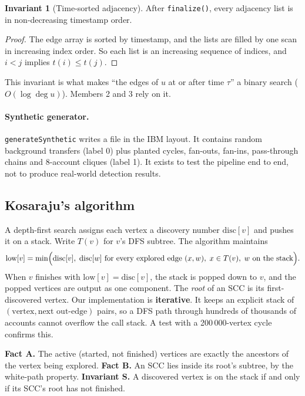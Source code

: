 \documentclass[11pt,a4paper]{article}
\theoremstyle{definition}
\newtheorem{invariant}[definition]{Invariant}
\begin{document}
\begin{invariant}[Time-sorted adjacency]
After \texttt{finalize()}, every adjacency list is in non-decreasing timestamp order.
\end{invariant}

\begin{proof}
The edge array is sorted by timestamp, and the lists are filled by one scan in increasing index order. So each list is an increasing sequence of indices, and $i < j$ implies $t(i) \le t(j)$.
\end{proof}

This invariant is what makes ``the edges of $u$ at or after time $\tau$'' a binary search ($O(\log \deg u)$). Members 2 and 3 rely on it.

\paragraph{Synthetic generator.} \texttt{generateSynthetic} writes a file in the IBM layout. It contains random background transfers (label 0) plus planted cycles, fan-outs, fan-ins, pass-through chains and 8-account cliques (label 1). It exists to test the pipeline end to end, not to produce real-world detection results.

\subsection{Kosaraju's algorithm}
A depth-first search assigns each vertex a discovery number $\text{disc}[v]$ and pushes it on a stack. Write $T(v)$ for $v$'s DFS subtree. The algorithm maintains
\[
\text{low}[v] = \min\Bigl(\text{disc}[v],\;\text{disc}[w] \text{ for every explored edge } (x, w),\; x \in T(v),\; w \text{ on the stack}\Bigr).
\]
When $v$ finishes with $\text{low}[v] = \text{disc}[v]$, the stack is popped down to $v$, and the popped vertices are output as one component. The \emph{root} of an SCC is its first-discovered vertex. Our implementation is \textbf{iterative}. It keeps an explicit stack of $(\text{vertex}, \text{next out-edge})$ pairs, so a DFS path through hundreds of thousands of accounts cannot overflow the call stack. A test with a 200\,000-vertex cycle confirms this.

\medskip\noindent
\textbf{Fact A.} The active (started, not finished) vertices are exactly the ancestors of the vertex being explored.
\textbf{Fact B.} An SCC lies inside its root's subtree, by the white-path property.
\textbf{Invariant S.} A discovered vertex is on the stack if and only if its SCC's root has not finished.
\end{document}
